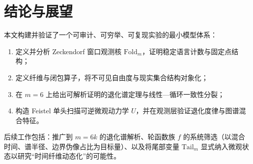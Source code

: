 \section{结论与展望}

本文构建并验证了一个可审计、可穷举、可复现实验的最小模型体系：
\begin{enumerate}
  \item 定义并分析 Zeckendorf 窗口观测核 $\mathrm{Fold}_m$，证明稳定语言计数与固定点结构；
  \item 定义纤维与闭包算子，将不可见自由度与现实集合结构对象化；
  \item 在 $m=6$ 上给出可解析证明的退化谱定理与线性—循环一致性分裂；
  \item 构造 Feistel 单头扫描可逆微观动力学 $U$，并在观测层验证退化度律与图谱混合特征。
\end{enumerate}

后续工作包括：推广到 $m=6k$ 的退化谱解析、轮函数族 $f$ 的系统筛选（以混合时间、谱半径、边界伪像占比为目标量）、以及将尾部变量 $\mathrm{Tail}_m$ 显式纳入微观状态以研究“时间纤维动态化”的可能性。

